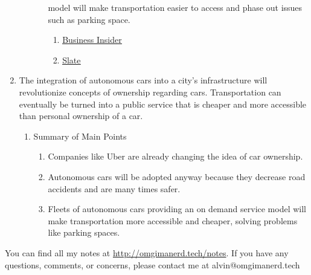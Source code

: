 \documentclass[letterpaper, 12pt]{article}
\begin{document}
\begin{enumerate}
\begin{enumerate}
\begin{enumerate}
        model will make transportation easier to access and phase out issues
        such as parking space.
      \begin{enumerate}
        \item \href{http://www.businessinsider.com/why-no-one-will-own-a-car-in-25-years-2015-6}{\underline{Business Insider}}
        \item \href{http://www.slate.com/articles/technology/future_tense/2016/10/self_driving_cars_effects_on_cities_depend_on_who_owns_them.html}{\underline{Slate}}
      \end{enumerate}
    \end{enumerate}
  \end{enumerate}
  \item The integration of autonomous cars into a city's infrastructure will
    revolutionize concepts of ownership regarding cars. Transportation can
    eventually be turned into a public service that is cheaper and more
    accessible than personal ownership of a car.
  \begin{enumerate}
    \item Summary of Main Points
    \begin{enumerate}
      \item Companies like Uber are already changing the idea of car ownership.
      \item Autonomous cars will be adopted anyway because they decrease road
        accidents and are many times safer.
      \item Fleets of autonomous cars providing an on demand service model will
        make transportation more accessible and cheaper, solving problems like
        parking spaces.
    \end{enumerate}
  \end{enumerate}
\end{enumerate}

\begin{center}
  You can find all my notes at \url{http://omgimanerd.tech/notes}. If you have
  any questions, comments, or concerns, please contact me at
  alvin@omgimanerd.tech
\end{center}
\end{document}
